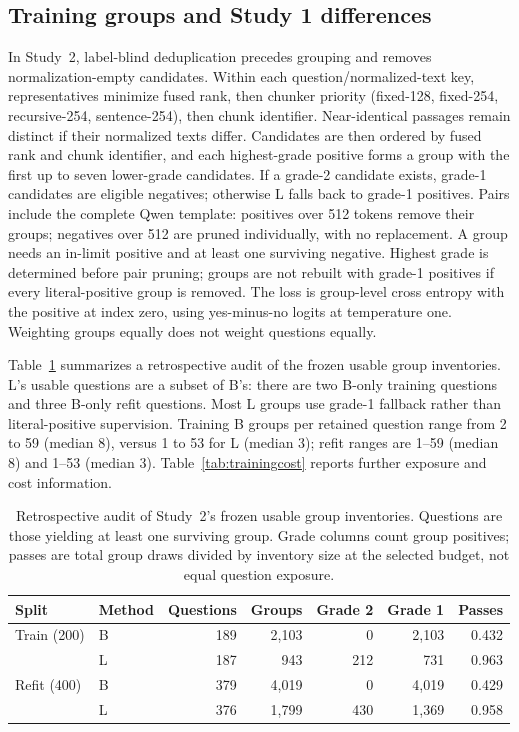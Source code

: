 \subsection{Training groups and Study 1 differences}
In Study~2, label-blind deduplication precedes grouping and removes normalization-empty candidates. Within each question/normalized-text key, representatives minimize fused rank, then chunker priority (fixed-128, fixed-254, recursive-254, sentence-254), then chunk identifier. Near-identical passages remain distinct if their normalized texts differ. Candidates are then ordered by fused rank and chunk identifier, and each highest-grade positive forms a group with the first up to seven lower-grade candidates. If a grade-2 candidate exists, grade-1 candidates are eligible negatives; otherwise L falls back to grade-1 positives. Pairs include the complete Qwen template: positives over 512 tokens remove their groups; negatives over 512 are pruned individually, with no replacement. A group needs an in-limit positive and at least one surviving negative. Highest grade is determined before pair pruning; groups are not rebuilt with grade-1 positives if every literal-positive group is removed. The loss is group-level cross entropy with the positive at index zero, using yes-minus-no logits at temperature one. Weighting groups equally does not weight questions equally.

Table~\ref{tab:groupaudit} summarizes a retrospective audit of the frozen usable group inventories. L's usable questions are a subset of B's: there are two B-only training questions and three B-only refit questions. Most L groups use grade-1 fallback rather than literal-positive supervision. Training B groups per retained question range from 2 to 59 (median 8), versus 1 to 53 for L (median 3); refit ranges are 1--59 (median 8) and 1--53 (median 3). Table~\ref{tab:trainingcost} reports further exposure and cost information.
\begin{table}[htbp]\centering\small
\caption{Retrospective audit of Study~2's frozen usable group inventories. Questions are those yielding at least one surviving group. Grade columns count group positives; passes are total group draws divided by inventory size at the selected budget, not equal question exposure.}\label{tab:groupaudit}
\begin{tabular}{llrrrrr}\toprule
Split & Method & Questions & Groups & Grade 2 & Grade 1 & Passes\\\midrule
Train (200) & B & 189 & 2,103 & 0 & 2,103 & 0.432\\
 & L & 187 & 943 & 212 & 731 & 0.963\\
Refit (400) & B & 379 & 4,019 & 0 & 4,019 & 0.429\\
 & L & 376 & 1,799 & 430 & 1,369 & 0.958\\\bottomrule
\end{tabular}\end{table}

